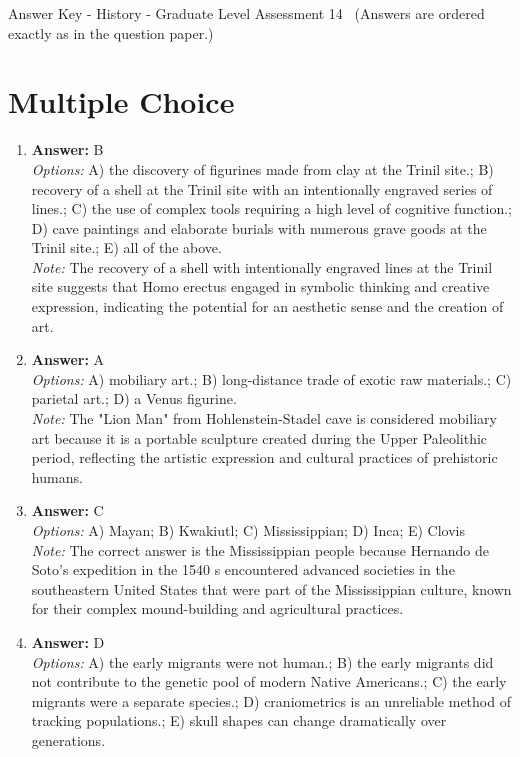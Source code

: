 \documentclass[12pt]{article}
\begin{document}
\begin{center}
Answer Key - History - Graduate Level Assessment 14 \
\small (Answers are ordered exactly as in the question paper.)
\end{center}

\section*{Multiple Choice}
\begin{enumerate}[label=\arabic*.]
\item \textbf{Answer:} B
\\ \textit{Options:} A) the discovery of figurines made from clay at the Trinil site.; B) recovery of a shell at the Trinil site with an intentionally engraved series of lines.; C) the use of complex tools requiring a high level of cognitive function.; D) cave paintings and elaborate burials with numerous grave goods at the Trinil site.; E) all of the above.
\\ \textit{Note:} The recovery of a shell with intentionally engraved lines at the Trinil site suggests that Homo erectus engaged in symbolic thinking and creative expression, indicating the potential for an aesthetic sense and the creation of art.
\item \textbf{Answer:} A
\\ \textit{Options:} A) mobiliary art.; B) long-distance trade of exotic raw materials.; C) parietal art.; D) a Venus figurine.
\\ \textit{Note:} The "Lion Man" from Hohlenstein-Stadel cave is considered mobiliary art because it is a portable sculpture created during the Upper Paleolithic period, reflecting the artistic expression and cultural practices of prehistoric humans.
\item \textbf{Answer:} C
\\ \textit{Options:} A) Mayan; B) Kwakiutl; C) Mississippian; D) Inca; E) Clovis
\\ \textit{Note:} The correct answer is the Mississippian people because Hernando de Soto's expedition in the 1540 s encountered advanced societies in the southeastern United States that were part of the Mississippian culture, known for their complex mound-building and agricultural practices.
\item \textbf{Answer:} D
\\ \textit{Options:} A) the early migrants were not human.; B) the early migrants did not contribute to the genetic pool of modern Native Americans.; C) the early migrants were a separate species.; D) craniometrics is an unreliable method of tracking populations.; E) skull shapes can change dramatically over generations.

\end{enumerate}
\end{document}
